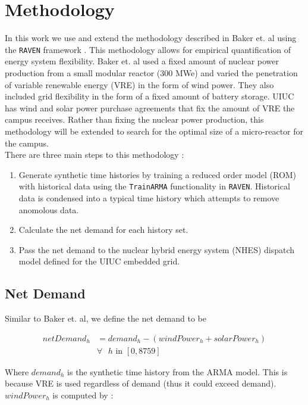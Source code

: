 \section{Methodology}

In this work we use and extend the methodology described in Baker et. al using the \texttt{RAVEN} framework \cite{baker_optimal_2018}\cite{alfonsi_raven_2016}. This methodology allows for empirical quantification of energy system flexibility. Baker et. al used a fixed amount of nuclear power production from a small modular reactor (300 MWe) and varied the penetration of variable renewable energy (VRE) in the form of wind power. They also included grid flexibility in the form of a fixed amount of battery storage. UIUC has wind and solar power purchase agreements that fix the amount of VRE the campus receives. Rather than fixing the nuclear power production, this methodology will be extended to search for the optimal size of a micro-reactor for the campus. \\
There are three main steps to this methodology \cite{baker_optimal_2018}: 

\begin{enumerate}
	\item Generate synthetic time histories by training a reduced order model (ROM) with historical data using the \texttt{TrainARMA} functionality in \texttt{RAVEN}. Historical data is condensed into a typical time history which attempts to remove anomolous data.
	\item Calculate the net demand for each history set.
	\item Pass the net demand to the nuclear hybrid energy system (NHES) dispatch model defined for the UIUC embedded grid. 
\end{enumerate}

\subsection{Net Demand}
Similar to Baker et. al, we define the net demand to be 


\begin{equation}
	\begin{split}
		netDemand_h & = demand_h - (windPower_h + solarPower_h) \\ 
		& \text{$\forall$ $h$ in } [0,8759]
	\end{split}
\end{equation}

Where $demand_h$ is the synthetic time history from the ARMA model. This is because VRE is used regardless of demand (thus it could exceed demand). $windPower_h$ is computed by \cite{garcia_nuclear_2015}:

